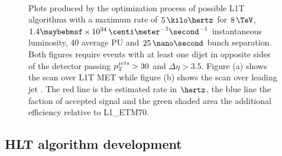 \begin{figure}[!htp]%
\centering
{}\qquad
{}\\
\caption{Plots produced by the optimization process of possible \gls{L1T} algorithms with a maximum rate of $5\,\kilo\hertz$ for $8\,\TeV$, $1.4 \times 10^{34}\,\centi\meter^{-2}\second^{-1}$ instantaneous luminosity, 40 average \gls{PU} and $25\,\nano\second$ bunch separation. Both figures require events with at least one dijet in opposite sides of the detector passing $p_{\mathrm{T}}^{jets}>30$ and $\Delta\eta>3.5$. Figure (a) shows the scan over \gls{L1T} \gls{MET} while figure (b) shows the scan over leading jet \pt. The red line is the estimated rate in $\hertz$, the blue line the faction of accepted signal and the green shaded area the additional efficiency relative to L1\_ETM70.}
\label{FIGURE:RunIIPreparation_L1TAlgorithmDevelopment_VariableScan}
\end{figure}

\subsection{HLT algorithm development}
\label{SECTION:RunIITriggerStudies_HLTAlgorithmDevelopment}

